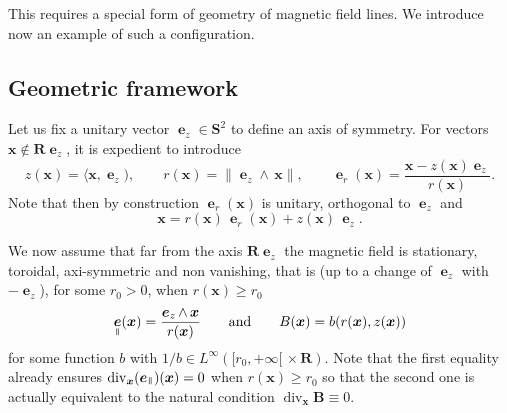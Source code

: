 \documentclass[JEP,XML,SOM,Unicode]{cedram}
\DeclareMathOperator{\Div}{div}
\theoremstyle{plain}
\theoremstyle{definition}
\newcommand\R{\mathbf R}
\newcommand\bB{{\boldsymbol B}}
\newcommand\bS{{\boldsymbol S}}
\newcommand\bfx{{\boldsymbol x}}
\DeclareMathOperator{\beD}{\boldsymbol{e}}
\newcommand\eDr{\beD_r}
\newcommand\eDz{\beD_z}
\newcommand\eDpar{\beD_\mypar}
\newcommand{\mypar}{{\mkern3mu\vphantom{\perp}\vrule depth 0pt\mkern2mu\vrule depth 0pt\mkern3mu}}
\begin{document}
This requires a special form of geometry of magnetic field lines. We introduce now an example of such a configuration.

\subsection{Geometric framework}
\label{s:geom-framework}

Let us fix a unitary vector $\eDz\in\bS^2$ to define an axis of symmetry. For vectors $\bfx\notin \R\eDz$, it is expedient to introduce
\[
z(\bfx)=\langle\bfx,\eDz),\qquad
r(\bfx)=\|\eDz\wedge\,\bfx\|,\qquad
\eDr(\bfx)=\frac{\bfx-z(\bfx)\eDz}{r(\bfx)}.
\]
Note that then by construction $\eDr(\bfx)$ is unitary, orthogonal to $\eDz$ and
\[
\bfx=r(\bfx)\,\eDr(\bfx)+z(\bfx)\,\eDz.
\]

We now assume that far from the axis $\R\eDz$ the magnetic field is stationary, toroidal, axi-symmetric and non vanishing, that is (up to a change of $\eDz$ with $-\eDz$), for some $r_0>0$, when $r(\bfx)\geq r_0$
\[
\eDpar(\bfx)=\frac{\eDz\wedge\,\bfx}{r(\bfx)}\qquad\textrm{and}\qquad
B(\bfx)=b(r(\bfx),z(\bfx))
\]
for some function $b$ with $1/b\in L^\infty([r_0,+\infty[\,\times\R)$. Note that the first equality already ensures $\Div_\bfx(\eDpar)(\bfx)=0$ when $r(\bfx)\geq r_0$ so that the second one is actually equivalent to the natural condition $\Div_\bfx\bB\equiv0$.
\end{document}
